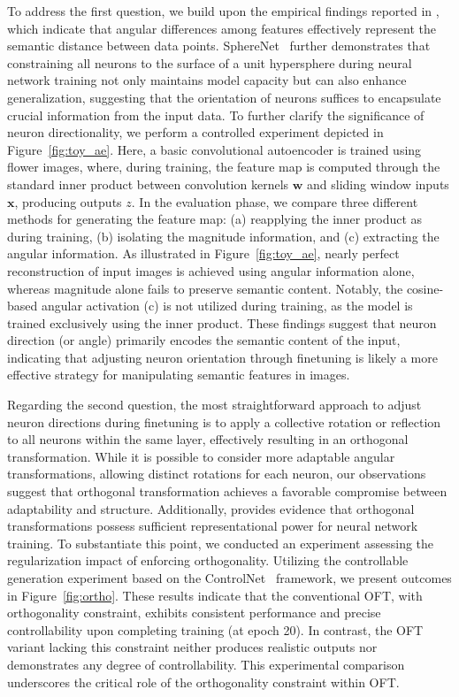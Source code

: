 To address the first question, we build upon the empirical findings reported in \cite{liu2018decoupled,chen2020angular}, which indicate that angular differences among features effectively represent the semantic distance between data points. SphereNet~\cite{liu2017deep} further demonstrates that constraining all neurons to the surface of a unit hypersphere during neural network training not only maintains model capacity but can also enhance generalization, suggesting that the orientation of neurons suffices to encapsulate crucial information from the input data. To further clarify the significance of neuron directionality, we perform a controlled experiment depicted in Figure~\ref{fig:toy_ae}. Here, a basic convolutional autoencoder is trained using flower images, where, during training, the feature map is computed through the standard inner product between convolution kernels $\bm{w}$ and sliding window inputs $\bm{x}$, producing outputs $z$. In the evaluation phase, we compare three different methods for generating the feature map: (a) reapplying the inner product as during training, (b) isolating the magnitude information, and (c) extracting the angular information. As illustrated in Figure~\ref{fig:toy_ae}, nearly perfect reconstruction of input images is achieved using angular information alone, whereas magnitude alone fails to preserve semantic content. Notably, the cosine-based angular activation (c) is not utilized during training, as the model is trained exclusively using the inner product. These findings suggest that neuron direction (or angle) primarily encodes the semantic content of the input, indicating that adjusting neuron orientation through finetuning is likely a more effective strategy for manipulating semantic features in images.

Regarding the second question, the most straightforward approach to adjust neuron directions during finetuning is to apply a collective rotation or reflection to all neurons within the same layer, effectively resulting in an orthogonal transformation. While it is possible to consider more adaptable angular transformations, allowing distinct rotations for each neuron, our observations suggest that orthogonal transformation achieves a favorable compromise between adaptability and structure. Additionally, \cite{liu2021orthogonal} provides evidence that orthogonal transformations possess sufficient representational power for neural network training. To substantiate this point, we conducted an experiment assessing the regularization impact of enforcing orthogonality. Utilizing the controllable generation experiment based on the ControlNet~\cite{zhang2023adding} framework, we present outcomes in Figure~\ref{fig:ortho}. These results indicate that the conventional OFT, with orthogonality constraint, exhibits consistent performance and precise controllability upon completing training (at epoch 20). In contrast, the OFT variant lacking this constraint neither produces realistic outputs nor demonstrates any degree of controllability. This experimental comparison underscores the critical role of the orthogonality constraint within OFT.

